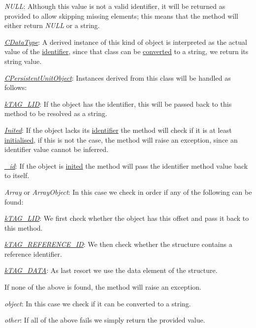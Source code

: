 \begin{DoxyItemize}
\item {\itshape N\-U\-L\-L}\-: Although this value is not a valid identifier, it will be returned as provided to allow skipping missing elements; this means that the method will either return {\itshape N\-U\-L\-L} or a string. 
\item {\itshape \hyperlink{class_c_data_type}{C\-Data\-Type}}\-: A derived instance of this kind of object is interpreted as the actual value of the \hyperlink{}{identifier}, since that class can be \hyperlink{class_c_data_type_a47c70c056d328f35497a6e712bf9be1c}{converted} to a string, we return its string value. 
\item {\itshape \hyperlink{class_c_persistent_unit_object}{C\-Persistent\-Unit\-Object}}\-: Instances derived from this class will be handled as follows\-: 
\begin{DoxyItemize}
\item {\itshape \hyperlink{}{k\-T\-A\-G\-\_\-\-L\-I\-D}}\-: If the object has the identifier, this will be passed back to this method to be resolved as a string. 
\item {\itshape \hyperlink{class_c_status_object_a8429102e4f52f7558649b64f4e673a69}{Inited}}\-: If the object lacks its \hyperlink{}{identifier} the method will check if it is at least \hyperlink{class_c_status_object_a8429102e4f52f7558649b64f4e673a69}{initialised}, if this is not the case, the method will raise an exception, since an identifier value cannot be inferred. 
\item {\itshape \hyperlink{class_c_persistent_unit_object_ad1ca0920cf0df3c24351402f9afbf34b}{\-\_\-id}}\-: If the object is \hyperlink{class_c_status_object_a8429102e4f52f7558649b64f4e673a69}{inited} the method will pass the identifier method value back to itself. 
\end{DoxyItemize}
\item {\itshape Array} or {\itshape Array\-Object}\-: In this case we check in order if any of the following can be found\-: 
\begin{DoxyItemize}
\item {\itshape \hyperlink{}{k\-T\-A\-G\-\_\-\-L\-I\-D}}\-: We first check whether the object has this offset and pass it back to this method. 
\item {\itshape \hyperlink{}{k\-T\-A\-G\-\_\-\-R\-E\-F\-E\-R\-E\-N\-C\-E\-\_\-\-I\-D}}\-: We then check whether the structure contains a reference identifier. 
\item {\itshape \hyperlink{}{k\-T\-A\-G\-\_\-\-D\-A\-T\-A}}\-: As last resort we use the data element of the structure. 
\end{DoxyItemize}If none of the above is found, the method will raise an exception. 
\item {\itshape object}\-: In this case we check if it can be converted to a string. 
\item {\itshape other}\-: If all of the above fails we simply return the provided value. 
\end{DoxyItemize}


